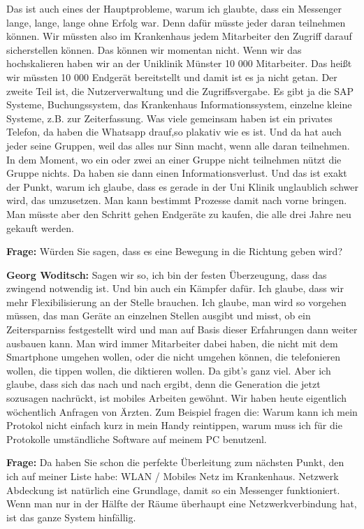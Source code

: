 Das ist auch eines der Hauptprobleme, warum ich glaubte, dass ein Messenger lange, lange, lange ohne Erfolg war. Denn dafür müsste jeder daran teilnehmen können. Wir müssten also im Krankenhaus jedem Mitarbeiter den Zugriff darauf sicherstellen können. Das können wir momentan nicht. Wenn wir das hochskalieren haben wir an der Uniklinik Münster 10 000 Mitarbeiter. Das heißt wir müssten 10 000 Endgerät bereitstellt und damit ist es ja nicht getan. Der zweite Teil ist, die Nutzerverwaltung und die Zugriffsvergabe. Es gibt ja die SAP Systeme, Buchungssystem, das Krankenhaus Informationssystem, einzelne kleine Systeme, z.B. zur Zeiterfassung. Was viele gemeinsam haben ist ein privates Telefon, da haben die Whatsapp drauf,so plakativ wie es ist. Und da hat auch jeder seine Gruppen, weil das alles nur Sinn macht, wenn alle daran teilnehmen. In dem Moment, wo ein oder zwei an einer Gruppe nicht teilnehmen nützt die Gruppe nichts. Da haben sie dann einen Informationsverlust. Und das ist exakt der Punkt, warum ich glaube, dass es gerade in der Uni Klinik unglaublich schwer wird, das umzusetzen. Man kann bestimmt Prozesse damit nach vorne bringen. Man müsste aber den Schritt gehen Endgeräte zu kaufen, die alle drei Jahre neu gekauft werden.

\textbf{Frage: } Würden Sie sagen, dass es eine Bewegung in die Richtung geben wird?

\textbf{Georg Woditsch: } Sagen wir so, ich bin der festen Überzeugung, dass das zwingend notwendig ist. Und bin auch ein Kämpfer dafür. Ich glaube, dass wir mehr Flexibilisierung an der Stelle brauchen. Ich glaube, man wird so vorgehen müssen, das man Geräte an einzelnen Stellen ausgibt und misst, ob ein Zeitersparniss festgestellt wird und man auf Basis dieser Erfahrungen dann weiter ausbauen kann. Man wird immer Mitarbeiter dabei haben, die nicht mit dem Smartphone umgehen wollen, oder die nicht umgehen können, die telefonieren wollen, die tippen wollen, die diktieren wollen. Da gibt's ganz viel. Aber ich glaube, dass sich das nach und nach ergibt, denn die Generation die jetzt sozusagen nachrückt, ist mobiles Arbeiten gewöhnt. Wir haben heute eigentlich wöchentlich Anfragen von Ärzten. Zum Beispiel fragen die: Warum kann ich mein Protokol nicht einfach kurz in mein Handy reintippen, warum muss ich für die Protokolle umständliche Software auf meinem PC benutzenl.

\textbf{Frage: }Da haben Sie schon die perfekte Überleitung zum nächsten Punkt, den ich auf meiner Liste habe:  WLAN / Mobiles Netz im Krankenhaus. Netzwerk Abdeckung ist natürlich eine Grundlage, damit so ein Messenger funktioniert. Wenn man nur in der Hälfte der Räume überhaupt eine Netzwerkverbindung hat, ist das ganze System hinfällig.

